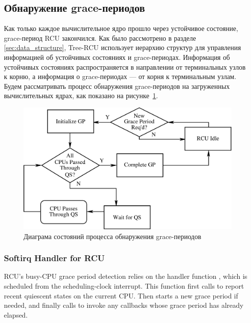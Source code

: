 \subsection{Обнаружение grace-периодов} \label{sec:grace_period}
Как только каждое вычислительное ядро прошло через устойчивое состояние,
grace-период RCU закончился.
Как было рассмотрено в разделе \ref{sec:data_structure},
Tree-RCU использует иерархию структур  для
управления информацией об устойчивых состояниях и grace-периодах.
Информация об устойчивых состояниях распространяется в направлении
от терминальных узлов к корню, а информация о grace-периодах ---
от корня к терминальным узлам.
%
Будем рассматривать процесс обнаружения grace-периодов на загруженных
вычислительных ядрах, как показано на рисунке~\ref{fig:grace_period_state_diagram}.

\begin{figure}[tb]
\centering
\includegraphics[scale=0.25]{grace_period_state_diagram.pdf}
\caption{Диаграма состояний процесса обнаружения grace-периодов}
\label{fig:grace_period_state_diagram}
\end{figure}

\subsubsection{Softirq Handler for RCU} \label{sec:rcu_softirq}
RCU's busy-CPU grace period detection relies on the
 handler function ,
which is scheduled from the scheduling-clock interrupt.
This function first calls
 to report recent quiescent states
on the current CPU.
Then  starts a new grace period if needed,
and finally calls  to invoke any callbacks
whose grace period has already elapsed.

